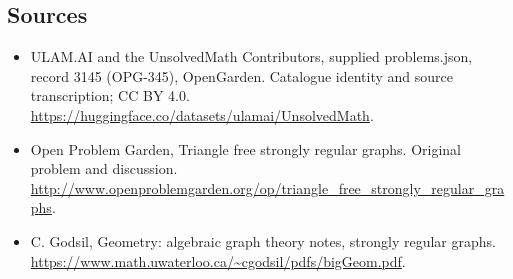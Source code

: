 \documentclass[11pt,a4paper]{article}
\begin{document}
\subsection{Sources}
\begin{itemize}
\item[S1] ULAM.AI and the UnsolvedMath Contributors, supplied problems.json, record 3145 (OPG-345), OpenGarden. Catalogue identity and source transcription; CC BY 4.0.
\url{https://huggingface.co/datasets/ulamai/UnsolvedMath}.
\item[S2] Open Problem Garden, Triangle free strongly regular graphs. Original problem and discussion.
\url{http://www.openproblemgarden.org/op/triangle_free_strongly_regular_graphs}.
\item[S3] C. Godsil, Geometry: algebraic graph theory notes, strongly regular graphs.
\url{https://www.math.uwaterloo.ca/~cgodsil/pdfs/bigGeom.pdf}.
\end{itemize}
\end{document}
